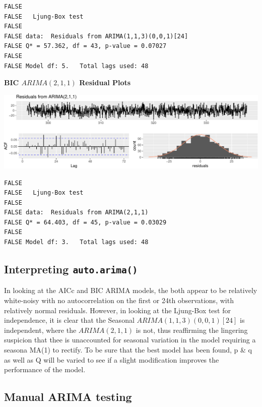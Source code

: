 \documentclass[openany]{book}
\begin{document}
\begin{verbatim}
FALSE 
FALSE   Ljung-Box test
FALSE 
FALSE data:  Residuals from ARIMA(1,1,3)(0,0,1)[24]
FALSE Q* = 57.362, df = 43, p-value = 0.07027
FALSE 
FALSE Model df: 5.   Total lags used: 48
\end{verbatim}

\textbf{BIC \(ARIMA(2,1,1)\) Residual Plots}

\includegraphics{Part-C-BP_files/figure-latex/unnamed-chunk-8-1.pdf}

\begin{verbatim}
FALSE 
FALSE   Ljung-Box test
FALSE 
FALSE data:  Residuals from ARIMA(2,1,1)
FALSE Q* = 64.403, df = 45, p-value = 0.03029
FALSE 
FALSE Model df: 3.   Total lags used: 48
\end{verbatim}

\hypertarget{interpreting-auto.arima}{%
\subsection{\texorpdfstring{Interpreting
\texttt{auto.arima()}}{Interpreting auto.arima()}}\label{interpreting-auto.arima}}

In looking at the AICc and BIC ARIMA models, the both appear to be
relatively white-noisy with no autocorrelation on the first or 24th
observations, with relatively normal residuals. However, in looking at
the Ljung-Box test for independence, it is clear that the Seasonal
\(ARIMA (1,1,3)(0,0,1)[24]\) is independent, where the \(ARIMA(2,1,1)\)
is not, thus reaffirming the lingering suspicion that thee is
unaccounted for seasonal variation in the model requiring a seasona
MA(1) to rectify. To be sure that the best model has been found, p \& q
as well as Q will be varied to see if a slight modification improves the
performance of the model.

\hypertarget{manual-arima-testing}{%
\subsection{Manual ARIMA testing}\label{manual-arima-testing}}
\end{document}
